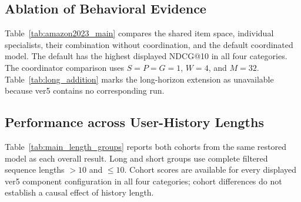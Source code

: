 \documentclass[11pt]{article}
\begin{document}
\begin{table}[!t]
\centering
\setlength{\tabcolsep}{3.2pt}
\caption{ver5 default reference. No ver5 run with an item-level long-horizon branch is available; -- denotes unavailable results.}
\label{tab:long_addition}
\end{table}


\subsection{Ablation of Behavioral Evidence}
Table~\ref{tab:amazon2023_main} compares the shared item space, individual specialists, their combination without coordination, and the default coordinated model. The default has the highest displayed NDCG@10 in all four categories. The coordinator comparison uses $S=P=G=1$, $W=4$, and $M=32$. Table~\ref{tab:long_addition} marks the long-horizon extension as unavailable because ver5 contains no corresponding run.

\subsection{Performance across User-History Lengths}
Table~\ref{tab:main_length_groups} reports both cohorts from the same restored model as each overall result. Long and short groups use complete filtered sequence lengths $>10$ and $\leq10$. Cohort scores are available for every displayed ver5 component configuration in all four categories; cohort differences do not establish a causal effect of history length.
\end{document}
